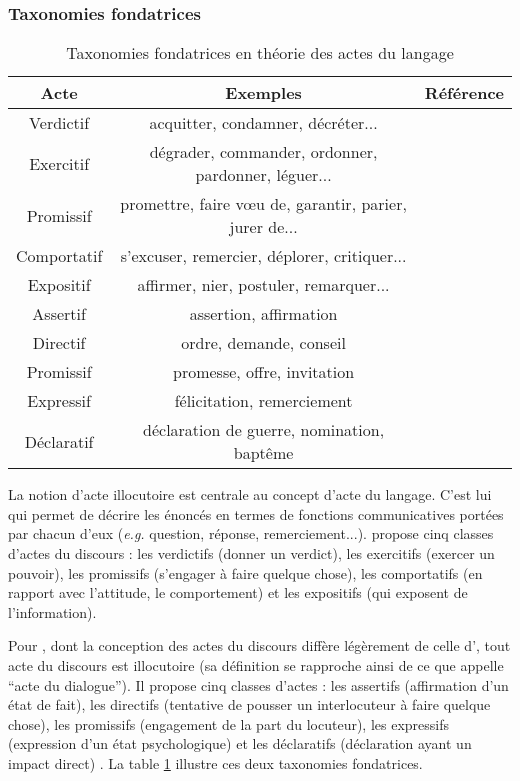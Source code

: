 \documentclass[10pt,a4paper,twoside]{article}
\newcommand{\quotes}[1]{``#1''}
\begin{document}
\subsubsection{Taxonomies fondatrices}

\begin{table}
	\centering
	\begin{tabular}{c c c}
		\toprule
		Acte & Exemples & Référence \\
		\midrule
		Verdictif & acquitter, condamner, décréter... & \\
		Exercitif & dégrader, commander, ordonner, pardonner, léguer... & \\
		Promissif & promettre, faire vœu de, garantir, parier, jurer de... & \citet{austin1975how} \\
		Comportatif & s’excuser, remercier, déplorer, critiquer... & \\
		Expositif & affirmer, nier, postuler, remarquer... & \\
		\midrule
		Assertif & assertion, affirmation & \\
		Directif & ordre, demande, conseil & \\
		Promissif & promesse, offre, invitation & \citet{searle1976taxonomy} \\
		Expressif & félicitation, remerciement & \\
		Déclaratif & déclaration de guerre, nomination, baptême & \\
		\bottomrule
	\end{tabular}
	\caption{Taxonomies fondatrices en théorie des actes du langage}
	\label{fig:fundamentalTaxonomies}
\end{table}

La notion d'acte illocutoire est centrale au concept d'acte du langage. C'est lui qui permet de décrire les énoncés en termes de fonctions communicatives portées par chacun d’eux (\textit{e.g.} question, réponse, remerciement...). \citeauthor{austin1975how} propose cinq classes d'actes du discours : les verdictifs (donner un verdict), les exercitifs (exercer un pouvoir), les promissifs (s'engager à faire quelque chose), les comportatifs (en rapport avec l'attitude, le comportement) et les expositifs (qui exposent de l'information). 

Pour \citet{searle1969speech}, dont la conception des actes du discours diffère légèrement de celle d'\citeauthor{austin1975how}, tout acte du discours est illocutoire (sa définition se rapproche ainsi de ce que \citeauthor{austin1975how} appelle \quotes{acte du dialogue}). Il propose cinq classes d’actes : les assertifs (affirmation d’un état de fait), les directifs (tentative de pousser un interlocuteur à faire quelque chose), les promissifs (engagement de la part du locuteur), les expressifs (expression d’un état psychologique) et les déclaratifs (déclaration ayant un impact direct) \cite{searle1976taxonomy}. La table \ref{fig:fundamentalTaxonomies} illustre ces deux taxonomies fondatrices.
\end{document}
